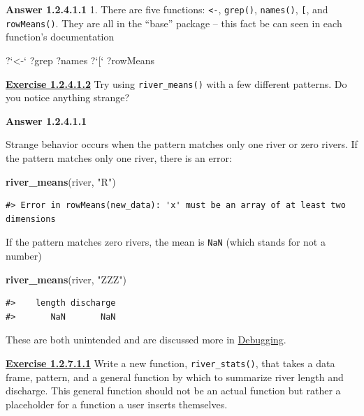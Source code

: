 \documentclass[
]{book}
\newenvironment{Shaded}{\begin{snugshade}}{\end{snugshade}}
\newcommand{\DataTypeTok}[1]{\textcolor[rgb]{0.13,0.29,0.53}{#1}}
\newcommand{\KeywordTok}[1]{\textcolor[rgb]{0.13,0.29,0.53}{\textbf{#1}}}
\newcommand{\NormalTok}[1]{#1}
\newcommand{\StringTok}[1]{\textcolor[rgb]{0.31,0.60,0.02}{#1}}
\begin{document}
\textbf{Answer 1.2.4.1.1} 1. There are five functions: \texttt{\textless{}-}, \texttt{grep()}, \texttt{names()}, \texttt{{[}}, and \texttt{rowMeans()}. They are all in the ``base'' package -- this fact be can seen in each function's documentation

\begin{Shaded}
\begin{Highlighting}[]
\NormalTok{?}\StringTok{`}\DataTypeTok{<-}\StringTok{`}
\NormalTok{?grep}
\NormalTok{?names}
\NormalTok{?}\StringTok{`}\DataTypeTok{[}\StringTok{`}
\NormalTok{?rowMeans}
\end{Highlighting}
\end{Shaded}

\textbf{\protect\hyperlink{ex-set2}{Exercise 1.2.4.1.2}} Try using \texttt{river\_means()} with a few different patterns. Do you notice anything strange?

\textbf{Answer 1.2.4.1.1}

Strange behavior occurs when the pattern matches only one river or zero rivers. If the pattern matches only one river, there is an error:

\begin{Shaded}
\begin{Highlighting}[]
\KeywordTok{river_means}\NormalTok{(river, }\StringTok{"R"}\NormalTok{)}
\end{Highlighting}
\end{Shaded}

\begin{verbatim}
#> Error in rowMeans(new_data): 'x' must be an array of at least two dimensions
\end{verbatim}

If the pattern matches zero rivers, the mean is \texttt{NaN} (which stands for not a number)

\begin{Shaded}
\begin{Highlighting}[]
\KeywordTok{river_means}\NormalTok{(river, }\StringTok{"ZZZ"}\NormalTok{)}
\end{Highlighting}
\end{Shaded}

\begin{verbatim}
#>    length discharge 
#>       NaN       NaN
\end{verbatim}

These are both unintended and are discussed more in \protect\hyperlink{debugging}{Debugging}.

\textbf{\protect\hyperlink{ex-set3}{Exercise 1.2.7.1.1}} Write a new function, \texttt{river\_stats()}, that takes a data frame, pattern, and a general function by which to summarize river length and discharge. This general function should not be an actual function but rather a placeholder for a function a user inserts themselves.
\end{document}
